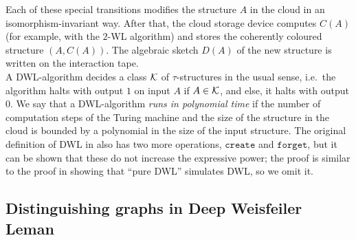 \documentclass[10pt,a4paper]{article}
\newcommand{\Kk}{{\cal K}}
\newcommand{\createOp }{\texttt{create}}
\newcommand{\forgetOp }{\texttt{forget}}
\begin{document}
	Each of these special transitions modifies the structure $A$ in the cloud in an isomorphism-invariant way. After that, the cloud storage device computes $C(A)$ (for example, with the $2$-WL algorithm) and stores the coherently coloured structure $(A,C(A))$. The algebraic sketch $D(A)$ of the new structure is written on the interaction tape.\\
	A DWL-algorithm decides a class $\Kk$ of $\tau$-structures in the usual sense, i.e.\ the algorithm halts with output $1$ on input $A$ if $A \in \Kk$, and else, it halts with output $0$. We say that a DWL-algorithm \emph{runs in polynomial time} if the number of computation steps of the Turing machine and the size of the structure in the cloud is bounded by a polynomial in the size of the input structure.
	The original definition of DWL in \cite{dwl} also has two more operations, $\createOp$ and $\forgetOp$, but it can be shown that these do not increase the expressive power; the proof is similar to the proof in \cite{dwl} showing that ``pure DWL'' simulates DWL, so we omit it.
	
	
	
	
	\subsection{Distinguishing graphs in Deep Weisfeiler Leman}
	\label{sec:PC_distinguishingGraphsDWL}
	
\end{document}
